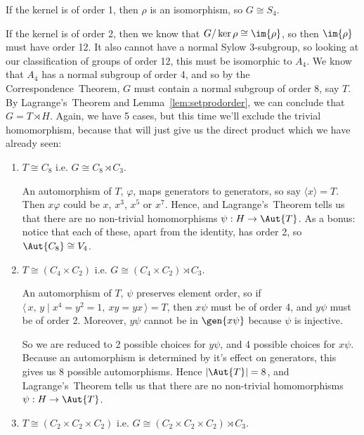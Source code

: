 If the kernel is of order 1, then \(\rho\) is an isomorphism, so \(G \cong S_4\).

If the kernel is of order 2, then we know that \(G/\ker{\rho} \cong \im{\rho}\), so then \(\im{\rho}\) must have order
12.
It also cannot have a normal Sylow 3-subgroup, so looking at our classification of groups of order 12, this must be
isomorphic to \(A_4\).
We know that \(A_4\) has a normal subgroup of order 4, and so by the Correspondence~Theorem, \(G\) must contain a normal
subgroup of order 8, say \(T\).
By Lagrange's~Theorem and Lemma~\ref{lem:setprodorder}, we can conclude that \(G = T \rtimes H\).
Again, we have 5 cases, but this time we'll exclude the trivial homomorphism, because that will just give us the direct
product which we have already seen:


\begin{enumerate}
    \item \(T \cong C_8\) i.e. \(G \cong C_8 \rtimes C_3\).

        An automorphism of \(T\), \(\varphi\), maps generators to generators, so say \(\langle x \rangle = T\).
        Then \(x\varphi\) could be \(x\), \(x^3\), \(x^5\) or \(x^7\).
        Hence, and Lagrange's~Theorem tells us that there are no non-trivial homomorphisms \(\psi:H \to \Aut{T}\).
        As a bonus: notice that each of these, apart from the identity, has order 2, so \(\Aut{C_8} \cong V_4\).

    \item \(T \cong (C_4 \times C_2)\) i.e. \(G \cong (C_4 \times C_2) \rtimes C_3\).

        An automorphism of \(T\), \(\psi\) preserves element order, so if \(\langle\,x,\,y \mid x^4 = y^2 = 1,\ xy =
        yx\,\rangle = T\), then \(x\psi\) must be of order 4, and \(y\psi\) must be of order 2.
        Moreover, \(y\psi\) cannot be in \(\gen{x\psi}\) because \(\psi\) is injective.

        So we are reduced to 2 possible choices for \(y\psi\), and 4 possible choices for \(x\psi\).
        Because an automorphism is determined by it's effect on generators, this gives us 8 possible automorphisms.
        Hence \(|\Aut{T}| = 8\), and Lagrange's~Theorem tells us that there are no non-trivial homomorphisms \(\psi:H
        \to \Aut{T}\).

    \item \(T \cong (C_2 \times C_2 \times C_2)\) i.e. \(G \cong (C_2 \times C_2 \times C_2) \rtimes C_3\).


\end{enumerate}
